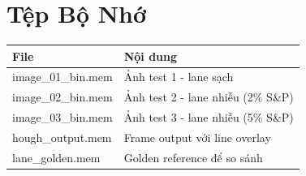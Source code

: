 \documentclass[12pt,a4paper]{article}
\begin{document}
\section{Tệp Bộ Nhớ}

\begin{table}[H]
\centering
\begin{tabular}{|l|l|}
\hline
\textbf{File} & \textbf{Nội dung} \\
\hline
image\_01\_bin.mem & Ảnh test 1 - lane sạch \\
\hline
image\_02\_bin.mem & Ảnh test 2 - lane nhiễu (2\% S\&P) \\
\hline
image\_03\_bin.mem & Ảnh test 3 - lane nhiễu (5\% S\&P) \\
\hline
hough\_output.mem & Frame output với line overlay \\
\hline
lane\_golden.mem & Golden reference để so sánh \\
\hline
\end{tabular}
\end{table}
\end{document}
